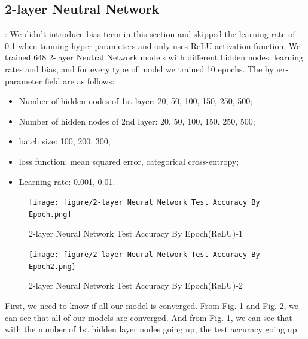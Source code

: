 \documentclass[8pt]{beamer}
\begin{document}
\subsection{2-layer Neutral Network}
\begin{frame}[allowframebreaks]{\secname : \subsecname}
We didn't introduce bias term in this section and skipped the learning rate of 0.1 when tunning hyper-parameters and only uses ReLU activation function. We trained 648 2-layer Neutral Network models with different hidden nodes, learning rates and bias, and for every type of model we trained 10 epochs. The hyper-parameter field are as follows:
\begin{itemize}
  \item Number of hidden nodes of 1st layer: 20, 50, 100, 150, 250, 500;
  \item Number of hidden nodes of 2nd layer: 20, 50, 100, 150, 250, 500;
  \item batch size: 100, 200, 300;
  \item loss function: mean squared error, categorical cross-entropy;
  \item Learning rate: 0.001, 0.01.
\end{itemize}

\begin{figure}[htbp]
\centerline{\texttt{[image: figure/2-layer Neural Network Test Accuracy By Epoch.png]}}
\caption{2-layer Neural Network Test Accuracy By Epoch(ReLU)-1}
\label{2-layer Neural Network Test Accuracy By Epoch(ReLU)-1}
\end{figure}
\begin{figure}[htbp]
\centerline{\texttt{[image: figure/2-layer Neural Network Test Accuracy By Epoch2.png]}}
\caption{2-layer Neural Network Test Accuracy By Epoch(ReLU)-2}
\label{2-layer Neural Network Test Accuracy By Epoch(ReLU)-2}
\end{figure}
First, we need to know if all our model is converged. From Fig. \ref{2-layer Neural Network Test Accuracy By Epoch(ReLU)-1} and Fig. \ref{2-layer Neural Network Test Accuracy By Epoch(ReLU)-2}, we can see that all of our models are converged. And from Fig. \ref{2-layer Neural Network Test Accuracy By Epoch(ReLU)-1}, we can see that with the number of 1st hidden layer nodes going up, the test accuracy going up.


\end{frame}
\end{document}
